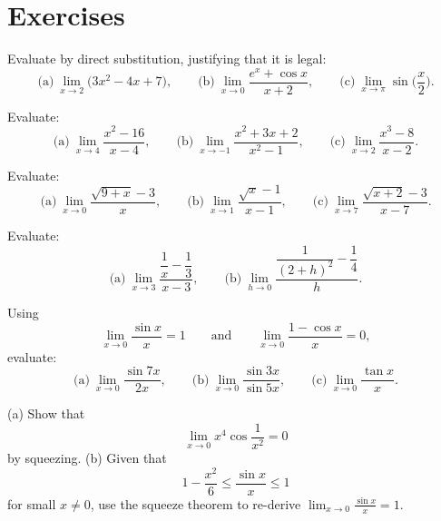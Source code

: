 \section*{Exercises}

\begin{exercise}[Substitution]
\label{ch07:exr-subst}
Evaluate by direct substitution, justifying that it is legal:
\[
  \text{(a)}\ \lim_{x\to 2}\big(3x^{2}-4x+7\big),
  \qquad
  \text{(b)}\ \lim_{x\to 0}\frac{e^{x}+\cos x}{x+2},
  \qquad
  \text{(c)}\ \lim_{x\to \pi}\sin\!\Big(\frac{x}{2}\Big).
\]
\end{exercise}

\begin{exercise}
\label{ch07:exr-factor}
Evaluate:
\[
  \text{(a)}\ \lim_{x\to 4}\frac{x^{2}-16}{x-4},
  \qquad
  \text{(b)}\ \lim_{x\to -1}\frac{x^{2}+3x+2}{x^{2}-1},
  \qquad
  \text{(c)}\ \lim_{x\to 2}\frac{x^{3}-8}{x-2}.
\]
\end{exercise}

\begin{exercise}[Rationalize]
\label{ch07:exr-rat}
Evaluate:
\[
  \text{(a)}\ \lim_{x\to 0}\frac{\sqrt{9+x}-3}{x},
  \qquad
  \text{(b)}\ \lim_{x\to 1}\frac{\sqrt{x}-1}{x-1},
  \qquad
  \text{(c)}\ \lim_{x\to 7}\frac{\sqrt{x+2}-3}{x-7}.
\]
\end{exercise}

\begin{exercise}
\label{ch07:exr-complex}
Evaluate:
\[
  \text{(a)}\ \lim_{x\to 3}\frac{\dfrac{1}{x}-\dfrac13}{x-3},
  \qquad
  \text{(b)}\ \lim_{h\to 0}\frac{\dfrac{1}{(2+h)^{2}}-\dfrac14}{h}.
\]
\end{exercise}

\begin{exercise}
\label{ch07:exr-trig}
Using
\[
  \lim_{x\to 0}\frac{\sin x}{x}=1
  \qquad\text{and}\qquad
  \lim_{x\to 0}\frac{1-\cos x}{x}=0,
\]
evaluate:
\[
  \text{(a)}\ \lim_{x\to 0}\frac{\sin 7x}{2x},
  \qquad
  \text{(b)}\ \lim_{x\to 0}\frac{\sin 3x}{\sin 5x},
  \qquad
  \text{(c)}\ \lim_{x\to 0}\frac{\tan x}{x}.
\]
\end{exercise}

\begin{exercise}[Squeeze]
\label{ch07:exr-squeeze}
(a) Show that
\[
  \lim_{x\to 0} x^{4}\cos\frac{1}{x^{2}} = 0
\]
by squeezing. (b) Given that
\[
  1 - \frac{x^{2}}{6} \le \frac{\sin x}{x} \le 1
\]
for small $x \neq 0$, use the squeeze theorem to re-derive
$\lim_{x\to 0}\frac{\sin x}{x}=1$.
\end{exercise}

